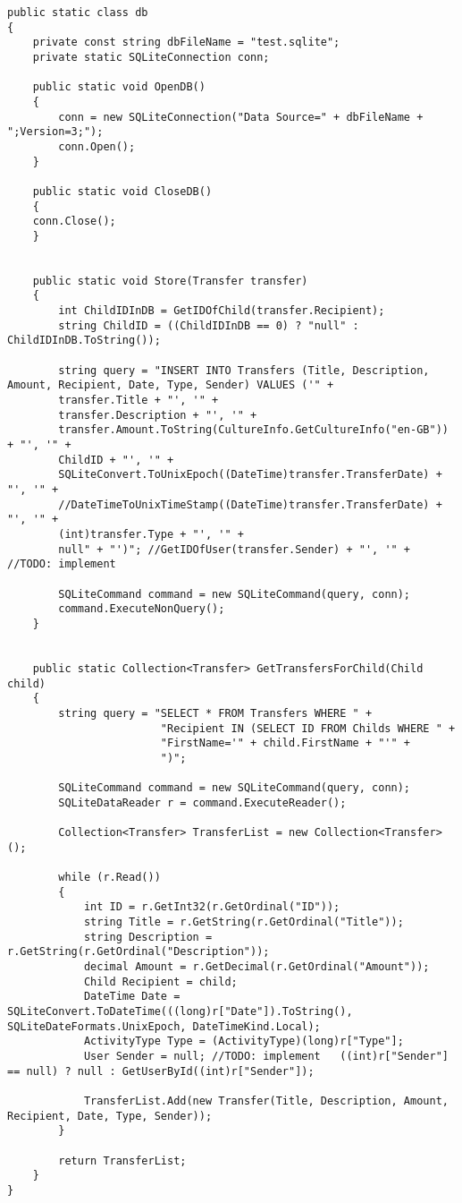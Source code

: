 \begin{lstlisting}[caption={Statisk klasse, der forbinder til den relationelle database SQLite},label={lst:sqlite}]
public static class db
{
	private const string dbFileName = "test.sqlite";
	private static SQLiteConnection conn;

	public static void OpenDB()
	{
		conn = new SQLiteConnection("Data Source=" + dbFileName + ";Version=3;");
		conn.Open();
	}

	public static void CloseDB()
	{
	conn.Close();
	}


	public static void Store(Transfer transfer)
	{
		int ChildIDInDB = GetIDOfChild(transfer.Recipient);
		string ChildID = ((ChildIDInDB == 0) ? "null" : ChildIDInDB.ToString());

		string query = "INSERT INTO Transfers (Title, Description, Amount, Recipient, Date, Type, Sender) VALUES ('" +
		transfer.Title + "', '" +
		transfer.Description + "', '" +
		transfer.Amount.ToString(CultureInfo.GetCultureInfo("en-GB")) + "', '" +
		ChildID + "', '" +
		SQLiteConvert.ToUnixEpoch((DateTime)transfer.TransferDate) + "', '" +
		//DateTimeToUnixTimeStamp((DateTime)transfer.TransferDate) + "', '" +
		(int)transfer.Type + "', '" +
		null" + "')"; //GetIDOfUser(transfer.Sender) + "', '" +   //TODO: implement

		SQLiteCommand command = new SQLiteCommand(query, conn);
		command.ExecuteNonQuery();
	}


	public static Collection<Transfer> GetTransfersForChild(Child child)
	{
		string query = "SELECT * FROM Transfers WHERE " +
						"Recipient IN (SELECT ID FROM Childs WHERE " +
						"FirstName='" + child.FirstName + "'" +
						")";

		SQLiteCommand command = new SQLiteCommand(query, conn);
		SQLiteDataReader r = command.ExecuteReader();

		Collection<Transfer> TransferList = new Collection<Transfer>();

		while (r.Read())
		{
			int ID = r.GetInt32(r.GetOrdinal("ID"));
			string Title = r.GetString(r.GetOrdinal("Title"));
			string Description = r.GetString(r.GetOrdinal("Description"));
			decimal Amount = r.GetDecimal(r.GetOrdinal("Amount"));
			Child Recipient = child;
			DateTime Date = SQLiteConvert.ToDateTime(((long)r["Date"]).ToString(), SQLiteDateFormats.UnixEpoch, DateTimeKind.Local);
			ActivityType Type = (ActivityType)(long)r["Type"];
			User Sender = null; //TODO: implement   ((int)r["Sender"] == null) ? null : GetUserById((int)r["Sender"]);

			TransferList.Add(new Transfer(Title, Description, Amount, Recipient, Date, Type, Sender));
		}

		return TransferList;
	}
}
\end{lstlisting}
